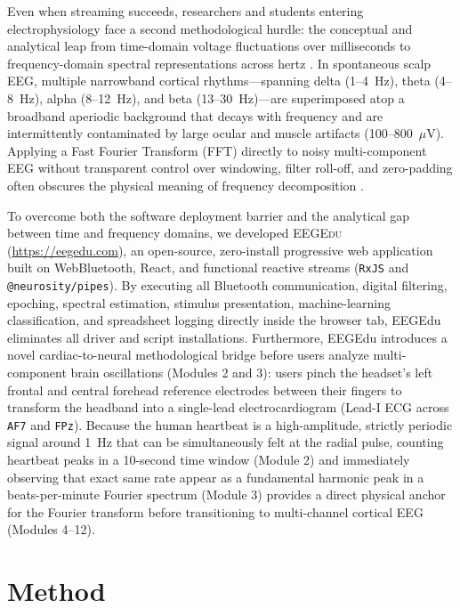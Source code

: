 \documentclass[11pt,letterpaper]{article}
\begin{document}
Even when streaming succeeds, researchers and students entering electrophysiology face a second methodological hurdle: the conceptual and analytical leap from time-domain voltage fluctuations over milliseconds to frequency-domain spectral representations across hertz \citep{keil2022recommendations}. In spontaneous scalp EEG, multiple narrowband cortical rhythms---spanning delta (1--4~Hz), theta (4--8~Hz), alpha (8--12~Hz), and beta (13--30~Hz)---are superimposed atop a broadband aperiodic background that decays with frequency \citep[$1/f^{\chi}$;][]{donoghue2020parameterizing} and are intermittently contaminated by large ocular and muscle artifacts (100--800~$\mu\text{V}$). Applying a Fast Fourier Transform (FFT) directly to noisy multi-component EEG without transparent control over windowing, filter roll-off, and zero-padding often obscures the physical meaning of frequency decomposition \citep{keil2022recommendations}.

To overcome both the software deployment barrier and the analytical gap between time and frequency domains, we developed \textsc{EEGEdu} (\url{https://eegedu.com}), an open-source, zero-install progressive web application built on WebBluetooth, React, and functional reactive streams (\texttt{RxJS} and \texttt{@neurosity/pipes}). By executing all Bluetooth communication, digital filtering, epoching, spectral estimation, stimulus presentation, machine-learning classification, and spreadsheet logging directly inside the browser tab, EEGEdu eliminates all driver and script installations. Furthermore, EEGEdu introduces a novel cardiac-to-neural methodological bridge before users analyze multi-component brain oscillations (Modules 2 and 3): users pinch the headset's left frontal and central forehead reference electrodes between their fingers to transform the headband into a single-lead electrocardiogram (Lead-I ECG across \texttt{AF7} and \texttt{FPz}). Because the human heartbeat is a high-amplitude, strictly periodic signal around 1~Hz that can be simultaneously felt at the radial pulse, counting heartbeat peaks in a 10-second time window (Module 2) and immediately observing that exact same rate appear as a fundamental harmonic peak in a beats-per-minute Fourier spectrum (Module 3) provides a direct physical anchor for the Fourier transform before transitioning to multi-channel cortical EEG (Modules 4--12).

\section{Method}
\end{document}
